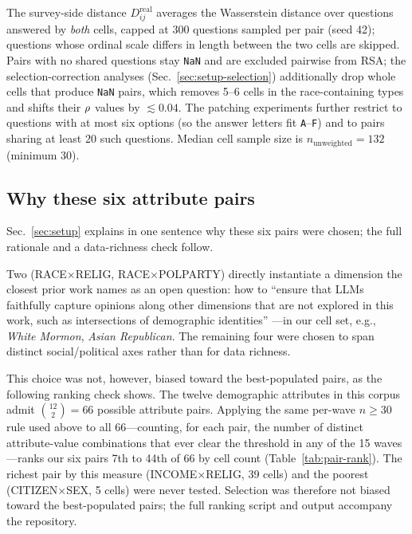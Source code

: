 The survey-side distance $D^{\mathrm{real}}_{ij}$ averages the
Wasserstein distance over questions answered by \emph{both} cells, capped
at $300$ questions sampled per pair (seed 42); questions whose ordinal
scale differs in length between the two cells are skipped. Pairs with no
shared questions stay \texttt{NaN} and are excluded pairwise from RSA; the
selection-correction analyses (Sec.~\ref{sec:setup-selection}) additionally
drop whole cells that produce \texttt{NaN} pairs, which removes 5--6 cells
in the race-containing types and shifts their $\rho$ values by
$\lesssim0.04$. The patching experiments further restrict to questions
with at most six options (so the answer letters fit \texttt{A}--\texttt{F})
and to pairs sharing at least 20 such questions. Median cell sample size
is $n_{\text{unweighted}}=132$ (minimum 30).

\subsection{Why these six attribute pairs}
\label{app:sixpairs}
Sec.~\ref{sec:setup} explains in one sentence why these six pairs were
chosen; the full rationale and a data-richness check follow.

Two (RACE$\times$RELIG, RACE$\times$POLPARTY) directly instantiate a
dimension the closest prior work names as an open question: how to
``ensure that LLMs faithfully capture opinions along other dimensions
that are not explored in this work, such as intersections of demographic
identities'' \citep[p.~9]{subpop2025}---in our cell set, e.g.,
\textit{White Mormon}, \textit{Asian Republican}. The remaining four were
chosen to span distinct social/political axes rather than for data
richness.

This choice was not, however, biased toward the best-populated pairs, as
the following ranking check shows. The twelve demographic attributes in
this corpus admit $\binom{12}{2}=66$ possible attribute pairs. Applying
the same per-wave $n\geq30$ rule used above to all 66---counting, for
each pair, the number of distinct attribute-value combinations that ever
clear the threshold in any of the 15 waves---ranks our six pairs 7th to
44th of 66 by cell count (Table~\ref{tab:pair-rank}). The richest pair by
this measure (INCOME$\times$RELIG, 39 cells) and the poorest
(CITIZEN$\times$SEX, 5 cells) were never tested. Selection was therefore
not biased toward the best-populated pairs; the full ranking script and
output accompany the repository.

